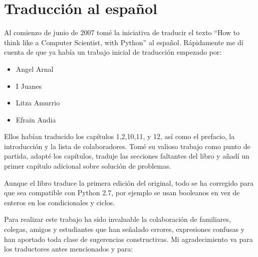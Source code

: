 


\chapter{Traducción al español}


Al comienzo de junio de 2007 tomé la iniciativa de traducir el texto 
``How to think like a Computer Scientist, with Python'' al español. Rápidamente
me dí cuenta de que ya había un trabajo inicial de traducción empezado por:

\begin{itemize}

\item Angel Arnal
\item I Juanes
\item Litza Amurrio
\item Efrain Andia

\end{itemize}

Ellos habían traducido los capítulos 1,2,10,11, y 12, así como el prefacio,
la introducción y la lista de colaboradores. Tomé su valioso trabajo como
punto de partida, adapté los capítulos, traduje las secciones faltantes 
del libro y añadí un primer capítulo adicional sobre solución de problemas.

Aunque el libro traduce la primera edición del original,
todo se ha corregido para que sea compatible con Python 2.7,
por ejemplo se usan booleanos en vez de enteros en los 
condicionales y ciclos. 

Para realizar este trabajo ha sido invaluable la colaboración de familiares, 
colegas, amigos y estudiantes que han señalado errores, expresiones confusas y han 
aportado toda clase de sugerencias constructivas. Mi agradecimiento va para los
traductores antes mencionados y para:

